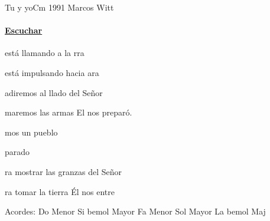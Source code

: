 \documentclass[12pt, spanish]{book}
\begin{document}
    \begin{song}{Tu y yo}{Cm}
    {1991} %
    {Marcos Witt}
    {} %
    {}
        \ifChordBk
        \paragraph{\mbox{}\hfill\protect\href{https://open.spotify.com/intl-es/track/4xTJWWZw6bjXzvi7TBbvYf}{Escuchar}\mbox{}\hfill}
        \fi

        \begin{SBOpGroup}
             está llamando a la rra

             está impulsando hacia ara

            adiremos al llado del Señor

            maremos las armas  El nos preparó.
        \end{SBOpGroup}

        \begin{SBChorus}
               mos un pueblo

               parado

            ra mostrar las granzas del Señor

            ra tomar la tierra  Él nos entre
        \end{SBChorus}

        \ifChordBk
        \begin{SBOpGroup}
            Acordes:\break
            \upchord{\Cm}\qquad Do Menor \hfill
            \upchord{\Bflat}\qquad Si bemol Mayor \hfill\null\break
            \upchord{\Fm}\qquad Fa Menor \hfill
            \upchord{\G}\qquad Sol Mayor \hfill\null\break
            \upchord{\AflatMaj}\qquad La bemol Maj \hfill\null\break
        \end{SBOpGroup}
        \fi
    \end{song}
\end{document}
